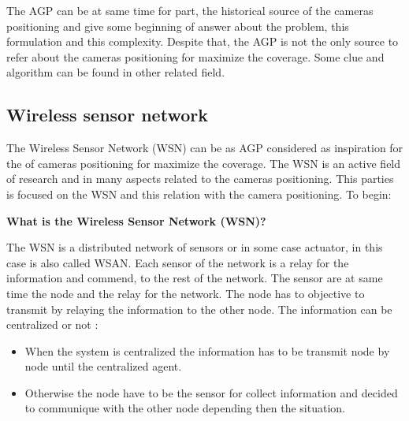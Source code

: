 The AGP can be at same time for part, the  historical source of the cameras positioning and give some beginning of answer about the problem, this formulation and this complexity. Despite that, the AGP is not the only source to refer about the cameras positioning for maximize the coverage. Some clue and algorithm can be found in other related field. 


\subsection{Wireless sensor network }

The Wireless Sensor Network (WSN) can be as AGP considered as inspiration for the  of cameras positioning for maximize the coverage. The WSN is an active field of research and in many aspects related to the cameras positioning. This parties is focused on the WSN and this relation with the camera positioning.  To begin:

\textbf{ What is the Wireless Sensor Network (WSN)? }

 The WSN is a distributed network of sensors or in some case actuator, in this case is also called WSAN. Each sensor of the network is a relay for the information and commend, to the rest of the network.  
The sensor are at same time the node and the relay for the network. The node has to objective to transmit by relaying the information to the other node. 
The information can be centralized or not :
\begin{itemize}
\item When the system is centralized the information has to be transmit node by node until the centralized agent.
\item Otherwise the node have to be the sensor for collect information and decided to communique with the other node depending then the situation. 

\end{itemize}
 
